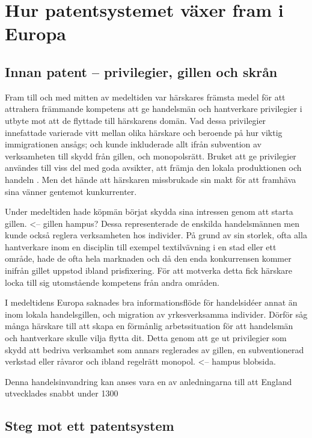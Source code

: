 \section{Hur patentsystemet växer fram i Europa}

\subsection{Innan patent -- privilegier, gillen och skrån} %
\label{sub:innan_patent_systemet}

Fram till och med mitten av medeltiden var härskares främsta medel för att
attrahera främmande kompetens att ge handelsmän och hantverkare privilegier i
utbyte mot att de flyttade till härskarens domän. 
Vad dessa privilegier innefattade varierade vitt mellan olika härskare och
beroende på hur viktig immigrationen ansågs; och kunde inkluderade allt ifrån
subvention av verksamheten till skydd från gillen, och monopolsrätt. 
Bruket att ge privilegier användes till viss del med goda avsikter, att främja
den lokala produktionen och handeln \cite{nard}. Men det hände att härskaren
missbrukade sin makt för att framhäva sina vänner gentemot kunkurrenter.

Under medeltiden hade köpmän börjat skydda sina intressen genom att starta
gillen. <-- gillen hampus?
Dessa representerade de enskilda handelsmännen men kunde också reglera
verksamheten hos individer.
På grund av sin storlek, ofta alla hantverkare inom en disciplin till exempel
textilvävning i en stad eller ett område, hade de ofta hela marknaden och då
den enda konkurrensen kommer inifrån gillet uppstod ibland prisfixering. 
För att motverka detta fick härskare locka till sig utomstående kompetens från
andra områden.

I medeltidens Europa saknades bra informationsflöde för handelsidéer annat än
inom lokala handelsgillen, och migration av yrkesverksamma individer. 
Dörför såg många härskare till att skapa en förmånlig arbetssituation för att
handelsmän och hantverkare skulle vilja flytta dit. 
Detta genom att ge ut privilegier som skydd att bedriva verksamhet som annars
reglerades av gillen, en subventionerad verkstad eller råvaror och ibland
regelrätt monopol. <-- hampus blobsida. 

Denna handelsinvandring kan anses vara en av anledningarna till att England
utvecklades snabbt under 1300



\subsection{Steg mot ett patentsystem} %
\label{sub:steg_mot_ett_patent_system}

